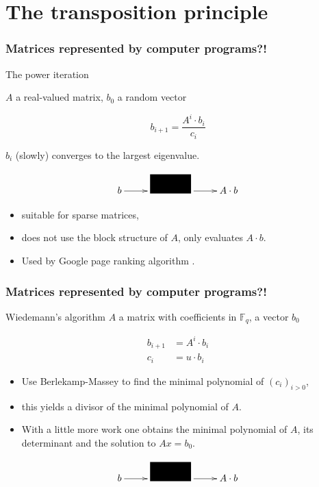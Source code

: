 \documentclass[10pt]{beamer}
\begin{document}

\section{The transposition principle}

\begin{frame}
  \frametitle{Matrices represented by computer programs?!}

  \begin{block}{The power iteration}
    \begin{center}
      $A$ a real-valued matrix, $b_0$ a random vector

      \[b_{i+1} = \frac{A^i \cdot b_i}{c_i}\]
      
      $b_i$ (slowly) converges to the largest eigenvalue.
    \end{center}
  \end{block}

  \[\xymatrix{
    b\ar[r]  & \rule{10ex}{2em} \ar[r] & A\cdot b
  }\]

  \begin{itemize}
  \item \alert{suitable for sparse matrices},
  \item \alert{does not use the block structure of $A$, only evaluates
      $A\cdot b$}.
  \item Used by Google page ranking algorithm \cite{google}.
  \end{itemize}
\end{frame}


\begin{frame}
  \frametitle{Matrices represented by computer programs?!}

  \begin{block}{Wiedemann's algorithm \cite{Wie86}}
    $A$ a matrix with coefficients in $\mathbb{F}_q$, a vector $b_0$

    \begin{align*}
      b_{i+1} &= A^i \cdot b_i\\
      c_i &= u\cdot b_i
    \end{align*}

    \begin{itemize}
    \item Use Berlekamp-Massey to find the minimal polynomial of $(c_i)_{i>0}$,
    \item this yields a divisor of the minimal polynomial of $A$.
    \item With a little more work one obtains the minimal polynomial
      of $A$, its determinant and the solution to $Ax=b_0$.
    \end{itemize}
  \end{block}

  \[\xymatrix{
    b\ar[r]  & \rule{10ex}{2em} \ar[r] & A\cdot b
  }\]
\end{frame}
\end{document}

